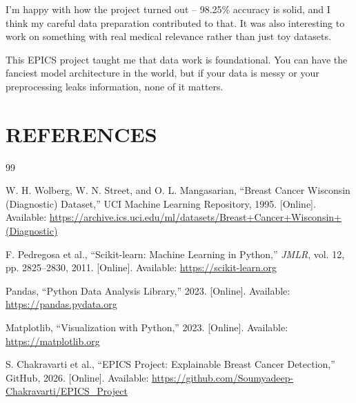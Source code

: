 \documentclass[12pt]{article}
\begin{document}
I'm happy with how the project turned out -- 98.25\% accuracy is solid, and I think my careful data preparation contributed to that. It was also interesting to work on something with real medical relevance rather than just toy datasets.

This EPICS project taught me that data work is foundational. You can have the fanciest model architecture in the world, but if your data is messy or your preprocessing leaks information, none of it matters.

\newpage
\section{REFERENCES}

\begin{thebibliography}{99}

W. H. Wolberg, W. N. Street, and O. L. Mangasarian, ``Breast Cancer Wisconsin (Diagnostic) Dataset,'' UCI Machine Learning Repository, 1995. [Online]. Available: \url{https://archive.ics.uci.edu/ml/datasets/Breast+Cancer+Wisconsin+(Diagnostic)}

F. Pedregosa et al., ``Scikit-learn: Machine Learning in Python,'' \textit{JMLR}, vol. 12, pp. 2825--2830, 2011. [Online]. Available: \url{https://scikit-learn.org}

Pandas, ``Python Data Analysis Library,'' 2023. [Online]. Available: \url{https://pandas.pydata.org}

Matplotlib, ``Visualization with Python,'' 2023. [Online]. Available: \url{https://matplotlib.org}

S. Chakravarti et al., ``EPICS Project: Explainable Breast Cancer Detection,'' GitHub, 2026. [Online]. Available: \url{https://github.com/Soumyadeep-Chakravarti/EPICS_Project}

\end{thebibliography}
\end{document}
